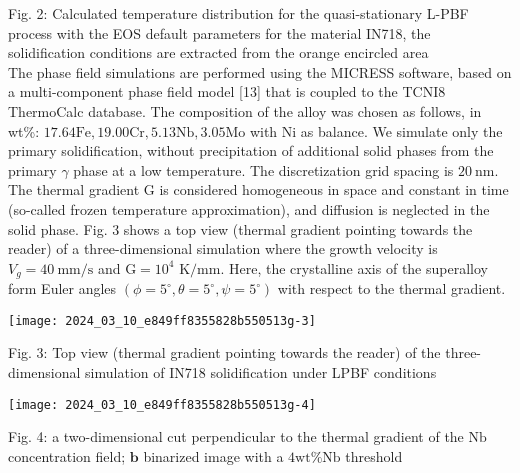 \documentclass[10pt]{article}
\begin{document}
Fig. 2: Calculated temperature distribution for the quasi-stationary L-PBF process with the EOS default parameters for the material IN718, the solidification conditions are extracted from the orange encircled area\\
The phase field simulations are performed using the MICRESS software, based on a multi-component phase field model [13] that is coupled to the TCNI8 ThermoCalc database. The composition of the alloy was chosen as follows, in wt\%: $17.64 \mathrm{Fe}, 19.00 \mathrm{Cr}, 5.13 \mathrm{Nb}, 3.05 \mathrm{Mo}$ with $\mathrm{Ni}$ as balance. We simulate only the primary solidification, without precipitation of additional solid phases from the primary $\gamma$ phase at a low temperature. The discretization grid spacing is $20 \mathrm{~nm}$. The thermal gradient $\mathrm{G}$ is considered homogeneous in space and constant in time (so-called frozen temperature approximation), and diffusion is neglected in the solid phase. Fig. 3 shows a top view (thermal gradient pointing towards the reader) of a three-dimensional simulation where the growth velocity is $V_{g}=40 \mathrm{~mm} / \mathrm{s}$ and $\mathrm{G}=10^{4}$ $\mathrm{K} / \mathrm{mm}$. Here, the crystalline axis of the superalloy form Euler angles $\left(\phi=5^{\circ}, \theta=5^{\circ}, \psi=5^{\circ}\right)$ with respect to the thermal gradient.

\begin{center}
\texttt{[image: 2024\_03\_10\_e849ff8355828b550513g-3]}
\end{center}

Fig. 3: Top view (thermal gradient pointing towards the reader) of the three-dimensional simulation of IN718 solidification under LPBF conditions

\begin{center}
\texttt{[image: 2024\_03\_10\_e849ff8355828b550513g-4]}
\end{center}

Fig. 4: a two-dimensional cut perpendicular to the thermal gradient of the $\mathrm{Nb}$ concentration field; $\mathbf{b}$ binarized image with a $4 \mathrm{wt} \% \mathrm{Nb}$ threshold
\end{document}
